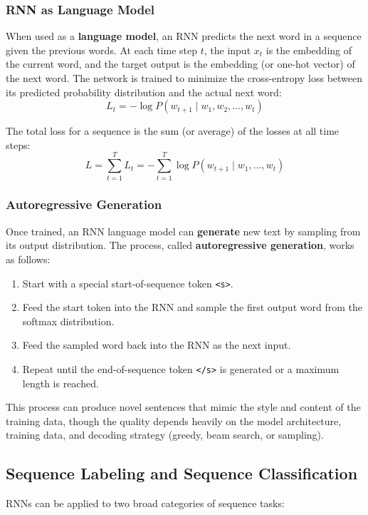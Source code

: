 \documentclass[11pt,a4paper]{article}
\begin{document}
\subsubsection{RNN as Language Model}

When used as a \textbf{language model}, an RNN predicts the next word in a sequence given the previous words. At each time step $t$, the input $x_t$ is the embedding of the current word, and the target output is the embedding (or one-hot vector) of the next word. The network is trained to minimize the cross-entropy loss between its predicted probability distribution and the actual next word:
\[
L_t = -\log P(w_{t+1} \mid w_1, w_2, \ldots, w_t)
\]

The total loss for a sequence is the sum (or average) of the losses at all time steps:
\[
L = \sum_{t=1}^{T} L_t = -\sum_{t=1}^{T} \log P(w_{t+1} \mid w_1, \ldots, w_t)
\]

\subsubsection{Autoregressive Generation}

Once trained, an RNN language model can \textbf{generate} new text by sampling from its output distribution. The process, called \textbf{autoregressive generation}, works as follows:
\begin{enumerate}
    \item Start with a special start-of-sequence token \texttt{<s>}.
    \item Feed the start token into the RNN and sample the first output word from the softmax distribution.
    \item Feed the sampled word back into the RNN as the next input.
    \item Repeat until the end-of-sequence token \texttt{</s>} is generated or a maximum length is reached.
\end{enumerate}

This process can produce novel sentences that mimic the style and content of the training data, though the quality depends heavily on the model architecture, training data, and decoding strategy (greedy, beam search, or sampling).

\subsection{Sequence Labeling and Sequence Classification}

RNNs can be applied to two broad categories of sequence tasks:
\end{document}
